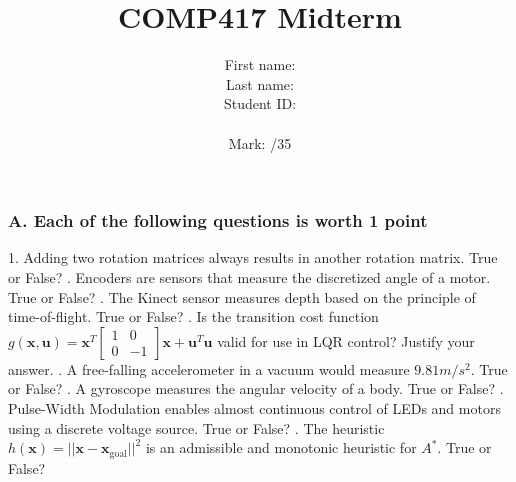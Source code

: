 \documentclass[a4paper,10pt]{article}
\date{\displaydate{date}}
\title{COMP417 Midterm}
\author{First name:\\
        Last name:\\
        Student ID:\\
         \\
        Mark: \quad  /35 }
\begin{document}
\maketitle

\subsubsection*{A. Each of the following questions is worth 1 point}
1. Adding two rotation matrices always results in another rotation matrix.
\newline
True or False?
\newline
{}. Encoders are sensors that measure the discretized angle of a motor. 
\newline
True or False?
\newline
{}. The Kinect sensor measures depth based on the principle of time-of-flight. 
\newline
True or False?
\newline
{}. Is the transition cost function $g(\textbf{x}, \textbf{u})=\textbf{x}^T\begin{bmatrix}
                                                                        1 & 0\\
                                                                        0 & -1
                                                                       \end{bmatrix}\textbf{x} + \textbf{u}^T\textbf{u}$
   valid for use in LQR control? Justify your answer.
\newline
\newline
\newline
{}. A free-falling accelerometer in a vacuum would measure $9.81m/s^2$. True or False?
\newline
\newline
{}. A gyroscope measures the angular velocity of a body. True or False?
\newline
\newline
{}. Pulse-Width Modulation enables almost continuous control of LEDs and motors using a discrete voltage source.   
True or False?
\newline
{}. The heuristic $h(\textbf{x})=||\textbf{x}-\textbf{x}_\text{goal}||^2$ is an admissible and monotonic heuristic for $A^*$. True or False?
\end{document}
